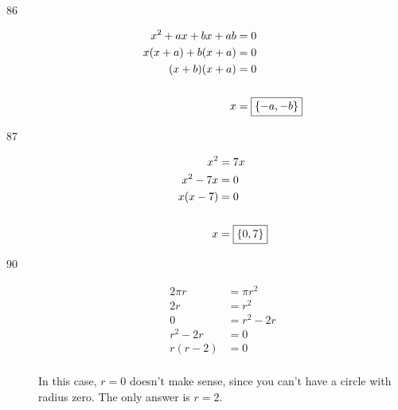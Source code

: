 \documentclass[letterpaper, landscape]{exam}
\begin{document}
\begin{description}
      \item[86]
        \begin{align*}
          x^2 + ax + bx + ab  & = 0 \\
          x(x + a) + b(x + a) & = 0 \\
          (x + b)(x + a)      & = 0 \\
          \\
          x                   & = \boxed{ \cbr{ -a, -b } }
        \end{align*}

      \item[87]
        \begin{align*}
          x^2      & = 7x \\
          x^2 - 7x & = 0 \\
          x(x - 7) & = 0 \\
          \\
          x        & = \boxed{ \cbr{ 0, 7 } } \\
        \end{align*}

      \item[90]
        \begin{align*}
          2 \pi r  & = \pi r^2 \\
          2r       & = r^2 \\
          0        & = r^2 - 2r \\
          r^2 - 2r & = 0 \\
          r(r - 2) & = 0 \\
        \end{align*}

      In this case, $r = 0$ doesn't make sense, since you can't have a circle with radius zero.  The
      only answer is $\boxed{ r = 2 }$.



    \end{description}
\end{document}
